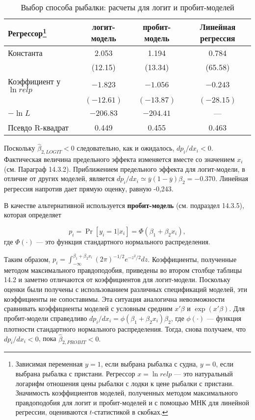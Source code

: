 \begin{table}[h]
\caption{\label{tab:pred} Выбор способа рыбалки: расчеты для логит и пробит-моделей}
\begin{minipage}{17cm}
\begin{tabular}{lccc} 
\hline 
\hline
\textbf{Регрессор}\footnote{Зависимая переменная $y=1$,  если выбрана рыбалка с судна,  $y=0$,  если выбрана рыбалка с пристани. Регрессор $x=\ln relp$ --- это натуральный логарифм отношения цены рыбалки с лодки к цене рыбалки с пристани. Значимость коэффициентов моделей,  полученных методом максимального правдоподобия для логит и пробит-моделей и с помощью МНК для линейной регрессии,  оцениваются $t$-статистикой в скобках.} & \textbf{логит-модель} & \textbf{пробит-модель} & \textbf{Линейная регрессия} \\ 
\hline 
Константа & 2.053 & 1.194 & 0.784 \\ 
 & (12.15) & (13.34) & (65.58) \\
Коэффициент у $\ln relp$ & $-1.823$ & $-1.056$ & $-0.243$ \\  
 & $(-12.61)$ & $(-13.87)$ & $(-28.15)$ \\
$-\ln L$ & $-206.83$ & $-204.41$ & --- \\ 
Псевдо R-квадрат & 0.449 & 0.455 & 0.463 \\ 
\hline
\hline 
\end{tabular}
\end{minipage}
\end{table}
Поскольку $\widehat{\beta}_{2,LOGIT} < 0$ следовательно,  как и ожидалось,  $dp_i/dx_i<0$. Фактическая величина предельного эффекта изменяется вместе со значением $x_i$ (см. Параграф 14.3.2). Приближением предельного эффекта для логит-модели,  в отличие от других моделей,  является $dp_i/dx_i \simeq  \overline{y}\left(1-\overline{y}\right) \widehat{\beta}_2=-0.370$. Линейная регрессия напротив дает прямую оценку,  равную -0,243.

В качестве альтернативной используется \textbf{пробит-модель} (см. подраздел 14.3.5),  которая определяет

\[p_i=\Pr\left[y_i=1\left|x_i\right.\right]=\Phi \left(\beta_1+\beta_2x_i\right), \] 
где $\Phi (\cdot )$ --- это функция стандартного нормального распределения. 

Таким образом,  $p_i=\int^{\beta_1+\beta_2x_i}_{-\infty} \left(2\pi \right)^{-1/2} e^{-z^2/2}dz$. Коэффициенты,  полученные методом максимального правдоподобия,  приведены во втором столбце таблицы 14.2 и заметно отличаются от коэффициентов для логит-модели. Поскольку оценки были получены с использованием различных спецификаций моделей, эти коэффициенты не сопоставимы. Эта ситуация аналогична невозможности сравнивать коэффициенты моделей с условным средним $x'\beta $ и $\exp \left(x'\beta \right)$. Для пробит-модели справедливо $dp_i/dx_i =\phi\left(\beta_1+\beta_2x_i\right)\beta_2$,  где $\phi (\cdot )$ --- функция плотности стандартного нормального распределения. Тогда,  снова получаем,  что $dp_i /dx_i<0$,  пока $\widehat{\beta}_{2, PROBIT} < 0.$

